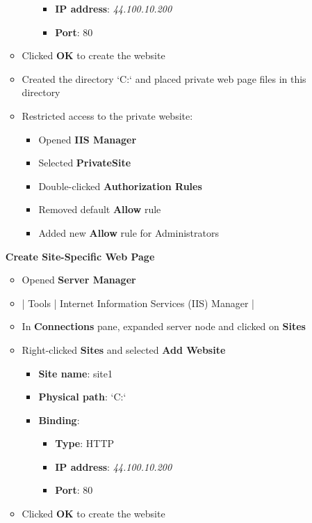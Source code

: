 \documentclass[letterpaper]{article}
\begin{document}
\begin{enumerate}
\begin{itemize}
\begin{itemize}
\begin{itemize}
\item \textbf{\textbf{IP address}}: \emph{44.100.10.200}
\item \textbf{\textbf{Port}}: 80
\end{itemize}
\end{itemize}
\item Clicked \textbf{\textbf{OK}} to create the website
\item Created the directory `C:\inetpub\wwwroot\private` and placed private web page files in this directory
\item Restricted access to the private website:
\begin{itemize}
\item Opened \textbf{\textbf{IIS Manager}}
\item Selected \textbf{\textbf{PrivateSite}}
\item Double-clicked \textbf{\textbf{Authorization Rules}}
\item Removed default \textbf{\textbf{Allow}} rule
\item Added new \textbf{\textbf{Allow}} rule for Administrators
\end{itemize}
\end{itemize}
\textbf{Create Site-Specific Web Page}
\begin{itemize}
\item Opened \textbf{\textbf{Server Manager}}
\item | Tools | Internet Information Services (IIS) Manager |
\item In \textbf{\textbf{Connections}} pane, expanded server node and clicked on \textbf{\textbf{Sites}}
\item Right-clicked \textbf{\textbf{Sites}} and selected \textbf{\textbf{Add Website}}
\begin{itemize}
\item \textbf{\textbf{Site name}}: site1
\item \textbf{\textbf{Physical path}}: `C:\inetpub\wwwroot{}`
\item \textbf{\textbf{Binding}}:
\begin{itemize}
\item \textbf{\textbf{Type}}: HTTP
\item \textbf{\textbf{IP address}}: \emph{44.100.10.200}
\item \textbf{\textbf{Port}}: 80
\end{itemize}
\end{itemize}
\item Clicked \textbf{\textbf{OK}} to create the website

\end{itemize}
\end{enumerate}
\end{document}
